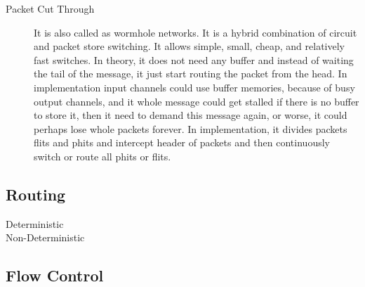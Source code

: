\begin{description}
\item[Packet Cut Through] It is also called as wormhole networks. It is a hybrid combination of circuit and packet store switching. It allows simple, small, cheap, and relatively fast switches. In theory, it does not need any buffer and instead of waiting the tail of the message, it just start routing the packet from the head. In implementation input channels could use buffer memories, because of busy output channels, and it whole message could get stalled if there is no buffer to store it, then it need to demand this message again, or worse, it could perhaps lose whole packets forever. In implementation, it divides packets flits and phits and intercept header of packets and then continuously switch or route all phits or flits.
\end{description}
\subsection{Routing}
\begin{description}
\item[Deterministic]
\item[Non-Deterministic]
\end{description}
\subsection{Flow Control}


